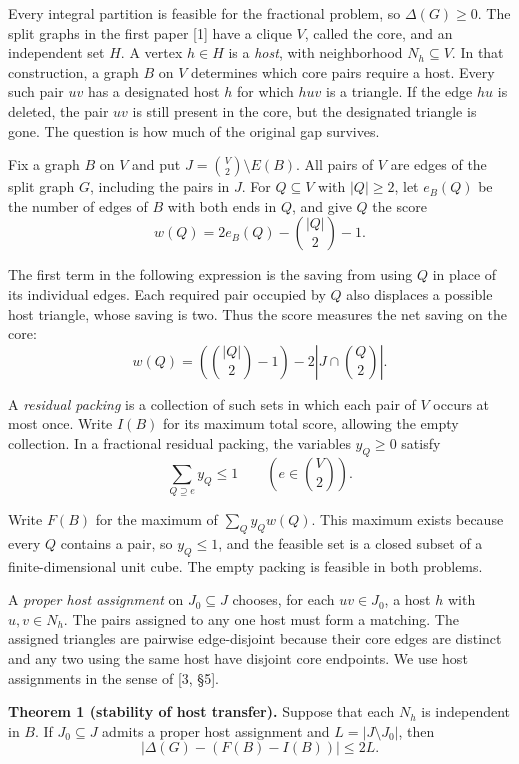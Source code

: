 \documentclass[english,11pt,a4paper]{article}
\begin{document}
Every integral partition is feasible for the fractional problem, so \(\Delta(G)\ge0\). The split graphs in the first paper {[}1{]} have a clique \(V\), called the core, and an independent set \(H\). A vertex \(h\in H\) is a \emph{host}, with neighborhood \(N_h\subseteq V\). In that construction, a graph \(B\) on \(V\) determines which core pairs require a host. Every such pair \(uv\) has a designated host \(h\) for which \(huv\) is a triangle. If the edge \(hu\) is deleted, the pair \(uv\) is still present in the core, but the designated triangle is gone. The question is how much of the original gap survives.

Fix a graph \(B\) on \(V\) and put \(J=\binom{V}{2}\setminus E(B)\). All pairs of \(V\) are edges of the split graph \(G\), including the pairs in \(J\). For \(Q\subseteq V\) with \(|Q|\ge2\), let \(e_B(Q)\) be the number of edges of \(B\) with both ends in \(Q\), and give \(Q\) the score
\[
w(Q)=2e_B(Q)-\binom{|Q|}{2}-1.
\]

The first term in the following expression is the saving from using \(Q\) in place of its individual edges. Each required pair occupied by \(Q\) also displaces a possible host triangle, whose saving is two. Thus the score measures the net saving on the core: \[
w(Q)=\left(\binom{|Q|}{2}-1\right)-2\left|J\cap\binom{Q}{2}\right|.
\]

A \emph{residual packing} is a collection of such sets in which each pair of \(V\) occurs at most once. Write \(I(B)\) for its maximum total score, allowing the empty collection. In a fractional residual packing, the variables \(y_Q\ge0\) satisfy
\[
\sum_{Q\supseteq e}y_Q\le1 \qquad \left(e\in\binom{V}{2}\right).
\]

Write \(F(B)\) for the maximum of \(\sum_Q y_Qw(Q)\). This maximum exists because every \(Q\) contains a pair, so \(y_Q\le1\), and the feasible set is a closed subset of a finite-dimensional unit cube. The empty packing is feasible in both problems.

A \emph{proper host assignment} on \(J_0\subseteq J\) chooses, for each \(uv\in J_0\), a host \(h\) with \(u,v\in N_h\). The pairs assigned to any one host must form a matching. The assigned triangles are pairwise edge-disjoint because their core edges are distinct and any two using the same host have disjoint core endpoints. We use host assignments in the sense of {[}3, §5{]}.

\textbf{Theorem 1 (stability of host transfer).} Suppose that each \(N_h\) is independent in \(B\). If \(J_0\subseteq J\) admits a proper host assignment and \(L=|J\setminus J_0|\), then
\[
\big|\Delta(G)-(F(B)-I(B))\big|\le 2L. \tag{1}
\]
\end{document}
